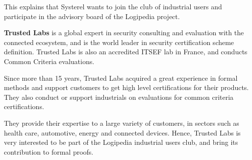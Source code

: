 {This explains that Systerel wants to join the club of industrial users 
and participate in the advisory board of the Logipedia project.

{\bf Trusted Labs} is a global expert in security consulting and
evaluation with the connected ecosystem, and is the world leader in
security certification scheme definition. Trusted Labs is also an
accredited ITSEF lab in France, and conducts Common Criteria
evaluations.


Since more than 15 years, Trusted Labs acquired a great experience in
formal methods and support customers to get high level certifications
for their products. They also conduct or support industrials on
evaluations for common criteria certifications.

They provide their expertise to a large variety of customers, in
sectors such as health care, automotive, energy and connected
devices. Hence, Trusted Labs is very interested to be part of the
Logipedia industrial users club, and bring its contribution to formal
proofs.
}




